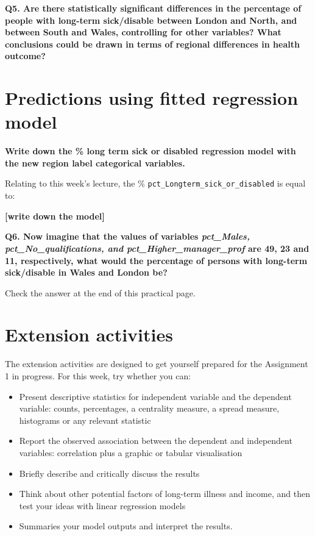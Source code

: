 \documentclass[
  letterpaper,
  DIV=11,
  numbers=noendperiod]{scrreprt}
\begin{document}
\textbf{Q5. Are there statistically significant differences in the
percentage of people with long-term sick/disable between London and
North, and between South and Wales, controlling for other variables?
What conclusions could be drawn in terms of regional differences in
health outcome?}

\section{Predictions using fitted regression
model}\label{predictions-using-fitted-regression-model}

\textbf{Write down the \% long term sick or disabled regression model
with the new region label categorical variables.}

Relating to this week's lecture, the \%
\texttt{pct\_Longterm\_sick\_or\_disabled} is equal to:

\textbf{{[}write down the model{]}}

\textbf{Q6. Now imagine that the values of variables \emph{pct\_Males,
pct\_No\_qualifications, and pct\_Higher\_manager\_prof} are 49, 23 and
11, respectively, what would the percentage of persons with long-term
sick/disable in Wales and London be?}

Check the answer at the end of this practical page.

\section{\texorpdfstring{\textbf{Extension
activities}}{Extension activities}}\label{extension-activities}

The extension activities are designed to get yourself prepared for the
Assignment 1 in progress. For this week, try whether you can:

\begin{itemize}
\item
  Present descriptive statistics for independent variable and the
  dependent variable: counts, percentages, a centrality measure, a
  spread measure, histograms or any relevant statistic
\item
  Report the observed association between the dependent and independent
  variables: correlation plus a graphic or tabular visualisation
\item
  Briefly describe and critically discuss the results
\item
  Think about other potential factors of long-term illness and income,
  and then test your ideas with linear regression models
\item
  Summaries your model outputs and interpret the results.
\end{itemize}
\end{document}
